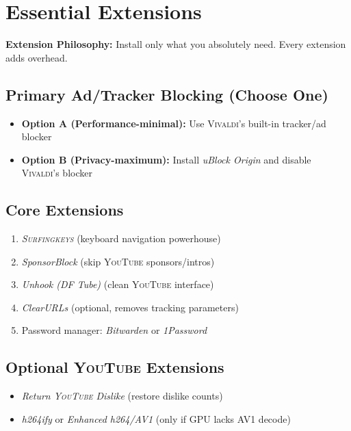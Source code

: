 \documentclass[11pt,a4paper,oneside]{book}
\newcommand{\vivaldi}{\textsc{Vivaldi}}
\newcommand{\youtube}{\textsc{YouTube}}
\newcommand{\surfingkeys}{\textsc{Surfingkeys}}
\newcommand{\extension}[1]{\textit{\color{primaryblue}#1}}
\begin{document}
\section{Essential Extensions}

\begin{tipbox}
\textbf{Extension Philosophy:} Install only what you absolutely need. Every extension adds overhead.
\end{tipbox}

\subsection{Primary Ad/Tracker Blocking (Choose One)}

\begin{itemize}
    \item \textbf{Option A (Performance-minimal):} Use \vivaldi{}'s built-in tracker/ad blocker
    \item \textbf{Option B (Privacy-maximum):} Install \extension{uBlock Origin} and disable \vivaldi{}'s blocker
\end{itemize}

\subsection{Core Extensions}

\begin{enumerate}
    \item \extension{\surfingkeys{}} (keyboard navigation powerhouse)
    \item \extension{SponsorBlock} (skip \youtube{} sponsors/intros)
    \item \extension{Unhook (DF Tube)} (clean \youtube{} interface)
    \item \extension{ClearURLs} (optional, removes tracking parameters)
    \item Password manager: \extension{Bitwarden} or \extension{1Password}
\end{enumerate}

\subsection{Optional \youtube{} Extensions}

\begin{itemize}
    \item \extension{Return \youtube{} Dislike} (restore dislike counts)
    \item \extension{h264ify} or \extension{Enhanced h264/AV1} (only if GPU lacks AV1 decode)
\end{itemize}
\end{document}
